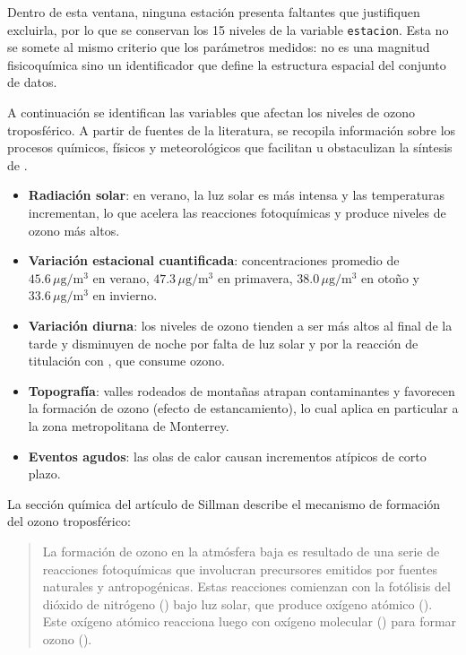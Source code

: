 Dentro de esta ventana, ninguna estación presenta faltantes que justifiquen excluirla, por lo que se conservan los 15 niveles de la variable \texttt{estacion}. Esta no se somete al mismo criterio que los parámetros medidos: no es una magnitud fisicoquímica sino un identificador
que define la estructura espacial del conjunto de datos.

A continuación se identifican las variables que afectan los niveles de ozono troposférico. A partir de fuentes de la literatura, se recopila información sobre los procesos químicos, físicos y meteorológicos que facilitan u obstaculizan la síntesis de .

\begin{itemize}
    \item \textbf{Radiación solar}: en verano, la luz solar es más intensa y las temperaturas incrementan, lo que acelera las reacciones fotoquímicas y produce niveles de ozono más altos.
    \item \textbf{Variación estacional cuantificada}: concentraciones promedio de $45.6\,\mu\mathrm{g}/\mathrm{m}^{3}$ en verano, $47.3\,\mu\mathrm{g}/\mathrm{m}^{3}$ en primavera, $38.0\,\mu\mathrm{g}/\mathrm{m}^{3}$ en otoño y $33.6\,\mu\mathrm{g}/\mathrm{m}^{3}$ en invierno.
    \item \textbf{Variación diurna}: los niveles de ozono tienden a ser más altos al final de la tarde y disminuyen de noche por falta de luz solar y por la reacción de titulación con , que consume ozono.
    \item \textbf{Topografía}: valles rodeados de montañas atrapan contaminantes y favorecen la formación de ozono (efecto de estancamiento), lo cual aplica en particular a la zona metropolitana de Monterrey.
    \item \textbf{Eventos agudos}: las olas de calor causan incrementos atípicos de corto plazo.
\end{itemize}

La sección química del artículo de Sillman \parencite{SanfordSillman} describe el mecanismo de formación del ozono troposférico:

\begin{quote}
    La formación de ozono en la atmósfera baja es resultado de una serie de reacciones fotoquímicas que involucran precursores emitidos por fuentes naturales y antropogénicas. Estas reacciones comienzan con la fotólisis del dióxido de nitrógeno () bajo luz solar, que produce oxígeno atómico (). Este oxígeno atómico reacciona luego con oxígeno molecular () para formar ozono ().
\end{quote}

